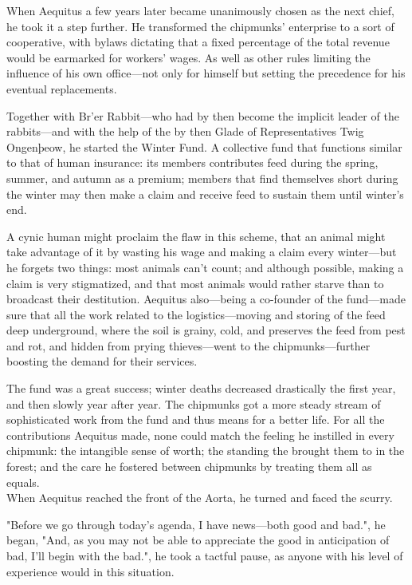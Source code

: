 When Aequitus a few years later became unanimously chosen as the next chief, he took it a step further. He transformed the chipmunks' enterprise to a sort of cooperative, with bylaws dictating that a fixed percentage of the total revenue would be earmarked for workers' wages. As well as other rules limiting the influence of his own office---not only for himself but setting the precedence for his eventual replacements. 

Together with Br'er Rabbit---who had by then become the implicit leader of the rabbits---and with the help of the by  then Glade of Representatives Twig Ongenþeow, he started the Winter Fund. A collective fund that functions similar to that of human insurance: its members contributes feed during the spring, summer, and autumn as a premium; members that find themselves short during the winter may then make a claim and receive feed to sustain them until winter's end. %

A cynic human might proclaim the flaw in this scheme, that an animal might take advantage of it by wasting his wage and making a claim every winter---but he forgets two things: most animals can't count; and although possible, making a claim is very stigmatized, and that most animals would rather starve than to broadcast their destitution. Aequitus also---being a co-founder of the fund---made sure that all the work related to the logistics---moving and storing of the feed deep underground, where the soil is grainy, cold, and preserves the feed from pest and rot, and hidden from prying thieves---went to the chipmunks---further boosting the demand for their services.

The fund was a great success; winter deaths decreased drastically the first year, and then slowly year after year. The chipmunks got a more steady stream of sophisticated work from the fund and thus means for a better life. For all the contributions Aequitus made, none could match the feeling he instilled in every chipmunk: the intangible sense of worth; the standing the brought them to in the forest; and the care he fostered between chipmunks by treating them all as equals.\\

When Aequitus reached the front of the Aorta, he turned and faced the scurry.

"Before we go through today's agenda, I have news---both good and bad.", he began, "And, as you may not be able to appreciate the good in anticipation of bad, I'll begin with the bad.", he took a tactful pause, as anyone with his level of experience would in this situation.


